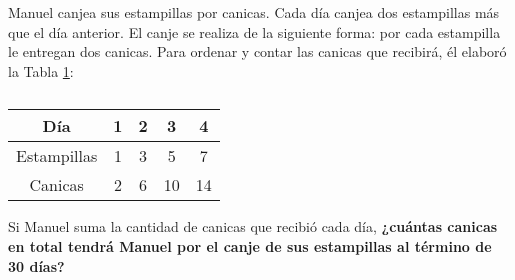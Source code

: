 \question[10] Manuel canjea sus estampillas por canicas. Cada día canjea dos estampillas más que el día anterior.
El canje se realiza de la siguiente forma: por cada estampilla le entregan dos canicas.
Para ordenar y contar las canicas que recibirá, él elaboró la Tabla \ref{tab:estampillas}:

\begin{table}[H]
    \centering
    \caption{}
    \label{tab:estampillas}
    \begin{tabular}{c|c|c|c|c}
        Día         & 1 & 2 & 3  & 4  \\ \hline
        Estampillas & 1 & 3 & 5  & 7  \\ \hline
        Canicas     & 2 & 6 & 10 & 14
    \end{tabular}
\end{table}

Si Manuel suma la cantidad de canicas que recibió cada día,
\textbf{¿cuántas canicas en total tendrá Manuel por el canje de sus estampillas al término de 30 días?}
